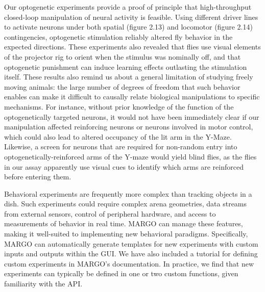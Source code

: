 \documentclass[12pt,letterpaper]{article}
\begin{document}
Our optogenetic experiments provide a proof of principle that high-throughput closed-loop manipulation of neural activity is feasible. Using different driver lines to activate neurons under both spatial (figure 2.13) and locomotor (figure 2.14) contingencies, optogenetic stimulation reliably altered fly behavior in the expected directions. These experiments also revealed that flies use visual elements of the projector rig to orient when the stimulus was nominally off, and that optogenetic punishment can induce learning effects outlasting the stimulation itself. These results also remind us about a general limitation of studying freely moving animals: the large number of degrees of freedom that such behavior enables can make it difficult to causally relate biological manipulations to specific mechanisms. For instance, without prior knowledge of the function of the optogenetically targeted neurons, it would not have been immediately clear if our manipulation affected reinforcing neurons or neurons involved in motor control, which could also lead to altered occupancy of the lit arm in the Y-Maze. Likewise, a screen for neurons that are required for non-random entry into optogenetically-reinforced arms of the Y-maze would yield blind flies, as the flies in our assay apparently use visual cues to identify which arms are reinforced before entering them.

Behavioral experiments are frequently more complex than tracking objects in a dish. Such experiments could require complex arena geometries, data streams from external sensors, control of peripheral hardware, and access to measurements of behavior in real time. MARGO can manage these features, making it well-suited to implementing new behavioral paradigms. Specifically, MARGO can automatically generate templates for new experiments with custom inputs and outputs within the GUI. We have also included a tutorial for defining custom experiments in MARGO's documentation. In practice, we find that new experiments can typically be defined in one or two custom functions, given familiarity with the API.
\end{document}
